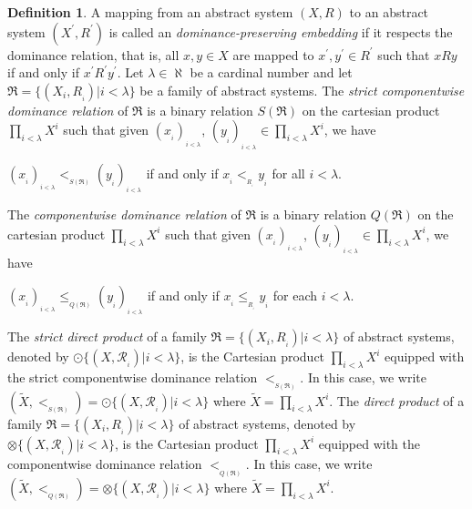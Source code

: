 \documentclass{article}
\theoremstyle{definition}
\newtheorem{definition}{Definition}[section]
\begin{document}
\begin{definition}\label{a124}
A mapping from an abstract system $(X,R)$ to an abstract system $(X^{\prime},R^{\prime})$ is called an {\it dominance-preserving embedding} if it respects the dominance relation, that is, all $x, y\in X$ are mapped to 
$x^{\prime}, y^{\prime}\in R^{\prime}$ such that $xRy$ if and only if $x^{\prime}R^{\prime}y^{\prime}$.
Let $\lambda\in \aleph$ be a cardinal number and let $\mathfrak{R}=\{(X_i,R_{_i})\vert i<\lambda\}$ be a family of abstract systems.
The {\it strict componentwise dominance relation} of $\mathfrak{R}$ is a binary relation $S(\mathfrak{R})$ on the cartesian product 
$\displaystyle\prod_{i<\lambda}X^{i}$
such that given $(x_{_i})_{_{i<\lambda}}$,
$(y_{_i})_{_{i<\lambda}}\in
\displaystyle\prod_{i<\lambda}X^{i}$, we have
\begin{center}
$(x_{_i})_{_{i<\lambda}}<_{_{S(\mathfrak{R})}}
(y_{_i})_{_{i<\lambda}}$
if and only if $x_{_i}<_{_{R_{_i}}} y_{_i}$ for all
$i<\lambda$.
\end{center}
The {\it componentwise dominance relation} 
of $\mathfrak{R}$ is a binary relation $Q(\mathfrak{R})$ on 
the cartesian product 
$\displaystyle\prod_{i<\lambda}X^{i}$
such that given $(x_{_i})_{_{i<\lambda}}$,
$(y_{_i})_{_{i<\lambda}}\in
\displaystyle\prod_{i<\lambda}X^{i}$, we have
\begin{center}
$(x_{_i})_{_{i<\lambda}}\leq_{_{Q(\mathfrak{R})}}
(y_{_i})_{_{i<\lambda}}$ if and only if  $x_{_i}\leq_{_{R_{_i}}} y_{_i}$
for each $i<\lambda$.
\end{center}
The {\it strict direct product} of a family $\mathfrak{R}=\{(X_i,R_{_i})\vert i<\lambda\}$
of abstract systems,
denoted by $\odot\{(X,\mathcal{R}_{_i})\vert i<\lambda\}$,
is the Cartesian product 
$\displaystyle\prod_{i<\lambda}X^i$ equipped with the strict
componentwise dominance relation $<_{_{S(\mathfrak{R})}}$. In this case, we write 
$(\widetilde{X},<_{_{S(\mathfrak{R})}})=\odot\{(X,\mathcal{R}_{_i})\vert i<\lambda\}$ where
$\widetilde{X}=\displaystyle\prod_{i<\lambda}X^i$.
The {\it direct product} 
of a family $\mathfrak{R}=\{(X_i,R_{_i})\vert i<\lambda\}$
of abstract systems,
denoted by $\otimes\{(X,\mathcal{R}_{_i})\vert i<\lambda\}$,
is the Cartesian product 
$\displaystyle\prod_{i<\lambda}X^i$ equipped with the
componentwise dominance relation
$<_{_{Q(\mathfrak{R})}}$. 
In this case, we write 
$(\widetilde{X},<_{_{Q(\mathfrak{R})}})=\otimes\{(X,\mathcal{R}_{_i})\vert i<\lambda\}$ where
$\widetilde{X}=\displaystyle\prod_{i<\lambda}X^i$.
\end{definition}
\end{document}
